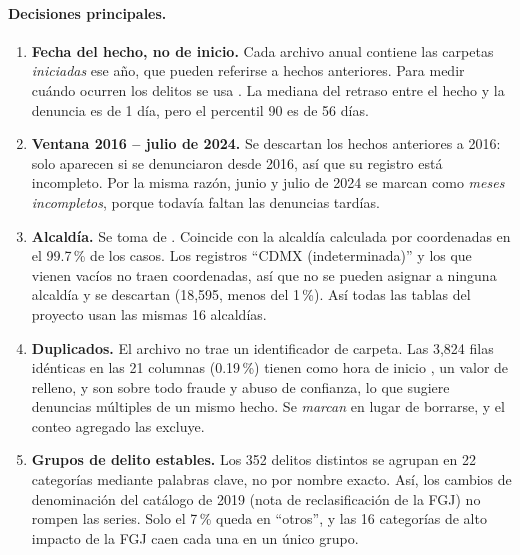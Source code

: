 \paragraph{Decisiones principales.}
\begin{enumerate}
  \item \textbf{Fecha del hecho, no de inicio.} Cada archivo anual contiene las carpetas
        \emph{iniciadas} ese año, que pueden referirse a hechos anteriores. Para medir cuándo ocurren
        los delitos se usa . La mediana del retraso entre el hecho y la denuncia
        es de 1 día, pero el percentil 90 es de 56 días.
  \item \textbf{Ventana 2016 -- julio de 2024.} Se descartan los hechos anteriores a 2016: solo
        aparecen si se denunciaron desde 2016, así que su registro está incompleto. Por la misma razón,
        junio y julio de 2024 se marcan como \emph{meses incompletos}, porque todavía faltan las
        denuncias tardías.
  \item \textbf{Alcaldía.} Se toma de . Coincide con la alcaldía calculada por
        coordenadas en el 99.7\,\% de los casos. Los registros \enquote{CDMX (indeterminada)} y los
        que vienen vacíos no traen coordenadas, así que no se pueden asignar a ninguna alcaldía y se
        descartan (18,595, menos del 1\,\%). Así todas las tablas del proyecto usan las mismas 16 alcaldías.
  \item \textbf{Duplicados.} El archivo no trae un identificador de carpeta. Las 3,824 filas
        idénticas en las 21 columnas (0.19\,\%) tienen como hora de inicio , un valor de relleno, y son sobre todo fraude y
        abuso de confianza, lo que sugiere denuncias múltiples de un mismo hecho. Se \emph{marcan} en
        lugar de borrarse, y el conteo agregado las excluye.
  \item \textbf{Grupos de delito estables.} Los 352 delitos distintos se agrupan en 22 categorías
        mediante palabras clave, no por nombre exacto. Así, los cambios de denominación del catálogo
        de 2019 (nota de reclasificación de la FGJ) no rompen las series. Solo el 7\,\% queda en
        \enquote{otros}, y las 16 categorías de alto impacto de la FGJ caen cada una en un único grupo.
\end{enumerate}

